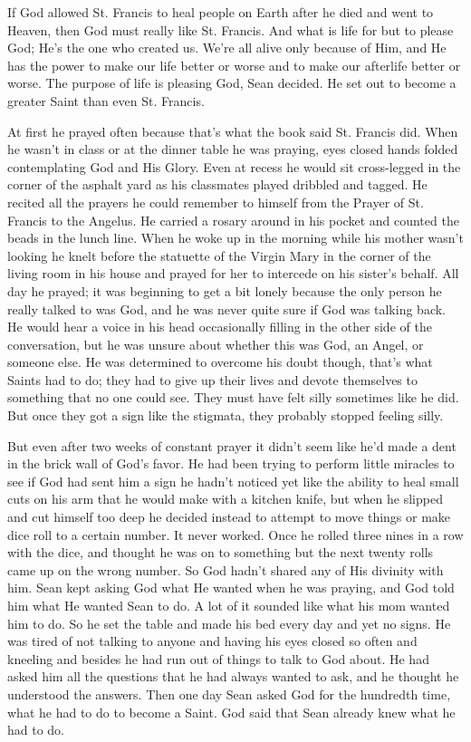 \documentclass[12pt]{article}
\begin{document}
If God allowed St. Francis to heal people on Earth after he died and went to Heaven, then God must really like St. Francis. 
And what is life for but to please God; He’s the one who created us. 
We’re all alive only because of Him, and He has the power to make our life better or worse and to make our afterlife better or worse. 
The purpose of life is pleasing God, Sean decided.   
He set out to become a greater Saint than even St. Francis.

At first he prayed often because that’s what the book said St. Francis did. When he wasn’t in class or at the dinner table he was praying, eyes closed hands folded contemplating God and His Glory. Even at recess he would sit cross-legged in the corner of the asphalt yard as his classmates played dribbled and tagged. He recited all the prayers he could remember to himself from the Prayer of St. Francis to the Angelus. He carried a rosary around in his pocket and counted the beads in the lunch line. When he woke up in the morning while his mother wasn’t looking he knelt before the statuette of the Virgin Mary in the corner of the living room in his house and prayed for her to intercede on his sister’s behalf. All day he prayed; it was beginning to get a bit lonely because the only person he really talked to was God, and he was never quite sure if God was talking back. He would hear a voice in his head occasionally filling in the other side of the conversation, but he was unsure about whether this was God, an Angel, or someone else. He was determined to overcome his doubt though, that’s what Saints had to do; they had to give up their lives and devote themselves to something that no one could see. They must have felt silly sometimes like he did. But once they got a sign like the stigmata, they probably stopped feeling silly.

But even after two weeks of constant prayer it didn’t seem like he’d made a dent in the brick wall of God’s favor. He had been trying to perform little miracles to see if God had sent him a sign he hadn’t noticed yet like the ability to heal small cuts on his arm that he would make with a kitchen knife, but when he slipped and cut himself too deep he decided instead to attempt to move things or make dice roll to a certain number. It never worked. Once he rolled three nines in a row with the dice, and thought he was on to something but the next twenty rolls came up on the wrong number. So God hadn’t shared any of His divinity with him. Sean kept asking God what He wanted when he was praying, and God told him what He wanted Sean to do. A lot of it sounded like what his mom wanted him to do. So he set the table and made his bed every day and yet no signs. He was tired of not talking to anyone and having his eyes closed so often and kneeling and besides he had run out of things to talk to God about. He had asked him all the questions that he had always wanted to ask, and he thought he understood the answers. Then one day Sean asked God for the hundredth time, what he had to do to become a Saint. God said that Sean already knew what he had to do.
\end{document}
